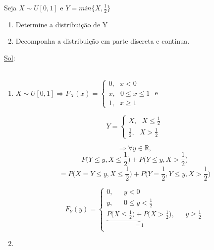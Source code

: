 \documentclass[a4paper,12pt]{article}
\begin{document}
Seja $X\sim U[0,1]$ e $Y=min\bigg\{ X,\frac{1}{2}\bigg\}$

\begin{enumerate}[label=\alph*)]
	\item Determine a distribuição de Y 
	\item Decomponha a distribuição em parte discreta e contínua.
	
\end{enumerate}
\underline{Sol}:\\
\\
\begin{enumerate}[label=\alph*)]
	\item 

 $X\sim U[0,1]\Rightarrow F_X(x)=
 \begin{cases}
 0,\ \ \ x<0\\
 x, \ \ \ 0\le x \le 1\\
 1,\ \ \ x\ge 1
 \end{cases}
 $
e

$$Y=\begin{cases}
X , \ \ \ X\le \frac{1}{2}\\
\frac{1}{2}, \ \ \ X>\frac{1}{2}
\end{cases} $$

$$\Rightarrow \forall y \in \mathbb R,$$
$$P\bigg(Y\le y,X\le \frac{1}{2}\bigg) +P\bigg(Y\le y,X> \frac{1}{2}\bigg)$$
$$= P\bigg(X=Y\le y , X\le \frac{1}{2}\bigg) +P\bigg(Y=\frac{1}{2} ,Y\le y, X> \frac{1}{2}\bigg)$$

$$F_Y(y)=\begin{cases}
0, \ \ \ \ \ \ \ y<0\\
y, \ \ \ \ \ \ \ 0\le y<\frac{1}{2}\\
\underbrace{P\bigg(X\le \frac{1}{2}\bigg)+P\bigg(X> \frac{1}{2}\bigg)}_{=1}, \ \ \ \ \ \ \ y\ge \frac{1}{2}\\
\end{cases} $$

\item 

\end{enumerate}
\end{document}
